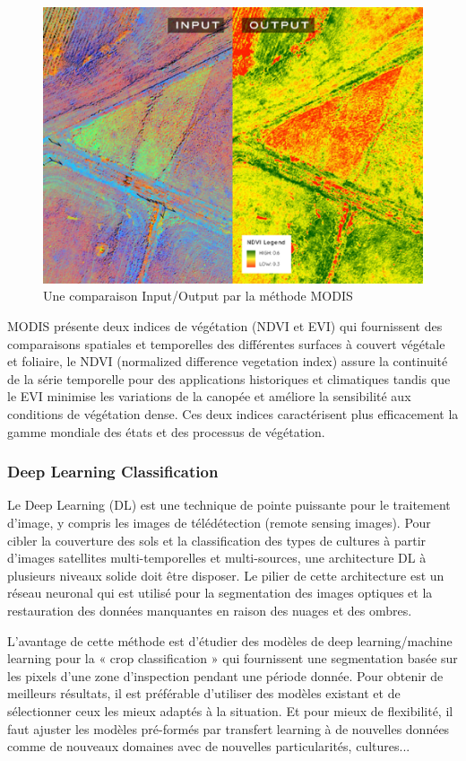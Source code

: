 \documentclass[12pt, openany]{report}
\begin{document}
\begin{figure}[h]
\centering
\includegraphics[scale=0.35]{modis.png}
\caption{Une comparaison Input/Output par la méthode MODIS}
\end{figure}

MODIS présente deux indices de végétation (NDVI et EVI) qui fournissent des comparaisons spatiales et temporelles des différentes surfaces à couvert végétale et foliaire, le NDVI (normalized difference vegetation index) assure la continuité de la série temporelle pour des applications historiques et climatiques tandis que le EVI minimise les variations de la canopée et améliore la sensibilité aux conditions de végétation dense.
Ces deux indices caractérisent plus efficacement la gamme mondiale des états et des processus de végétation. \cite{modis}

\subsubsection{Deep Learning Classification}
Le Deep Learning (DL) est une technique de pointe puissante pour le traitement d'image, y compris les images de télédétection (remote sensing images). 
Pour cibler la couverture des sols et la classification des types de cultures à partir d'images satellites multi-temporelles et multi-sources, une architecture DL à plusieurs niveaux solide doit être disposer. 
Le pilier de cette architecture est un réseau neuronal qui est utilisé pour la segmentation des images optiques et la restauration des données manquantes en raison des nuages et des ombres. \cite{deeplearning}

L’avantage de cette méthode est d’étudier des modèles de deep learning/machine learning pour la « crop classification » qui fournissent une segmentation basée sur les pixels d'une zone d'inspection pendant une période donnée. Pour obtenir de meilleurs résultats, il est préférable d’utiliser des modèles existant et de sélectionner ceux les mieux adaptés à la situation. Et pour mieux de flexibilité, il faut ajuster les modèles pré-formés par transfert learning à de nouvelles données comme de nouveaux domaines avec de nouvelles particularités, cultures...
\end{document}
